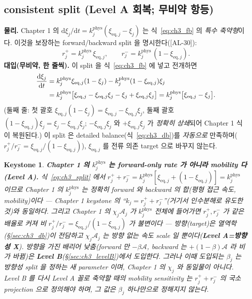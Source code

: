 \documentclass[11pt,a4paper]{article}
\newtheorem*{keybox}{Keystone}
\newcommand{\dd}{\mathrm{d}}
\newcommand{\eq}{\mathrm{eq}}
\newcommand{\AL}[1]{\textsf{[AL-#1]}}
\begin{document}
\subsection{consistent split (Level A 회복; 무비약 항등)}\label{sec:ch3_split}
\textbf{물리.} Chapter 1 의 $\dd\xi_j/\dd t=k_j^{\mathrm{phys}}(\xi_{\eq,j}-\xi_j)$ 는 식~\eqref{eq:ch3_fb} 의
\emph{특수 축약형}이다. 이것을 보장하는 forward/backward split 을 명시한다(\AL{30}):
\begin{equation}
r_j^+=k_j^{\mathrm{phys}}\,\xi_{\eq,j},\qquad r_j^-=k_j^{\mathrm{phys}}\,(1-\xi_{\eq,j}).
\label{eq:ch3_split}
\end{equation}
\textbf{대입(무비약, 한 줄씩).} 이 split 을 식~\eqref{eq:ch3_fb} 에 넣고 전개하면
\begin{align}
\frac{\dd\xi_j}{\dd t}
&=k_j^{\mathrm{phys}}\xi_{\eq,j}(1-\xi_j)-k_j^{\mathrm{phys}}(1-\xi_{\eq,j})\xi_j \notag\\
&=k_j^{\mathrm{phys}}\big[\xi_{\eq,j}-\xi_{\eq,j}\xi_j-\xi_j+\xi_{\eq,j}\xi_j\big]
=k_j^{\mathrm{phys}}\big[\xi_{\eq,j}-\xi_j\big].
\label{eq:ch3_recover}
\end{align}
(둘째 줄: 첫 괄호 $\xi_{\eq,j}(1-\xi_j)=\xi_{\eq,j}-\xi_{\eq,j}\xi_j$, 둘째 괄호 $(1-\xi_{\eq,j})\xi_j=\xi_j-\xi_{\eq,j}\xi_j$;
$-\xi_{\eq,j}\xi_j$ 와 $+\xi_{\eq,j}\xi_j$ 가 \emph{정확히 상쇄}되어 Chapter 1 식이 복원된다.) 이 split 은
detailed balance(식~\eqref{eq:ch3_db})를 \emph{자동으로} 만족하며($r_j^+/r_j^-=\xi_{\eq,j}/(1-\xi_{\eq,j})$),
$\xi_{\eq,j}$ 를 전류 의존 target 으로 바꾸지 않는다.

\begin{keybox}
\textbf{Chapter 1 의 $k_j^{\mathrm{phys}}$ 는 forward-only rate 가 아니라 mobility 다 (Level A).} 식~\eqref{eq:ch3_split}
에서 $r_j^++r_j^-=k_j^{\mathrm{phys}}[\xi_{\eq,j}+(1-\xi_{\eq,j})]=k_j^{\mathrm{phys}}$ 이므로 Chapter 1 의
$k_j^{\mathrm{phys}}$ 는 정확히 \emph{forward 와 backward 의 합}(평형 접근 속도, mobility)이다 — Chapter 1
keystone 의 ``$k_j=r_j^++r_j^-$''(거기서 인수분해로 유도한 것)와 동일하다. 그리고 Chapter 1 의 $\chi_j\mathcal A_j$
가 $k_j^{\mathrm{phys}}$ \emph{전체}에 들어가면 $r_j^+,r_j^-$ 가 \emph{같은 배율}로 커져 비
$r_j^+/r_j^-=\xi_{\eq,j}/(1-\xi_{\eq,j})$ 가 \emph{불변}이다 — 방향(target)은 열역학(\S\ref{sec:ch3_db})이
전담하고 $\chi_j\mathcal A_j$ 는 \emph{방향 없는} 속도 scale 일 뿐이다(\textbf{Level A=방향성 X}). \emph{방향을
가진} 배리어 낮춤(forward 만 $-\beta\mathcal A$, backward 는 $+(1-\beta)\mathcal A$ 라 비가 바뀜)은
\textbf{Level B}(\S\ref{sec:ch3_levelB})에서 도입한다. 그러나 이때 도입되는 $\beta_j$ 는 방향성 split 을 정하는
새 parameter 이며, Chapter 1 의 $\chi_j$ 와 동일물이 아니다. Level B 를 다시 Level A 꼴로 축약할 때의
mobility sensitivity 는 $r_j^++r_j^-$ 의 국소 projection 으로 정의해야 하며, 그 값은 $\beta_j$ 하나만으로
정해지지 않는다.
\end{keybox}
\end{document}
